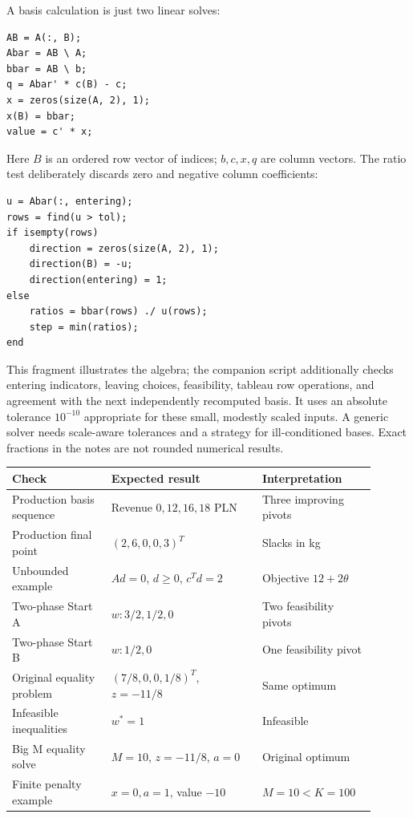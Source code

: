 \documentclass[11pt,a4paper]{article}
\begin{document}
A basis calculation is just two linear solves:
\begin{lstlisting}
AB = A(:, B);
Abar = AB \ A;
bbar = AB \ b;
q = Abar' * c(B) - c;
x = zeros(size(A, 2), 1);
x(B) = bbar;
value = c' * x;
\end{lstlisting}
Here $B$ is an ordered row vector of indices; $b,c,x,q$ are column vectors.
The ratio test deliberately discards zero and negative column coefficients:
\begin{lstlisting}
u = Abar(:, entering);
rows = find(u > tol);
if isempty(rows)
    direction = zeros(size(A, 2), 1);
    direction(B) = -u;
    direction(entering) = 1;
else
    ratios = bbar(rows) ./ u(rows);
    step = min(ratios);
end
\end{lstlisting}
This fragment illustrates the algebra; the companion script additionally checks
entering indicators, leaving choices, feasibility, tableau row operations, and
agreement with the next independently recomputed basis. It uses an absolute
tolerance $10^{-10}$ appropriate for these small, modestly scaled inputs.
A generic solver needs scale-aware tolerances and a strategy for ill-conditioned
bases. Exact fractions in the notes are not rounded numerical results.

\begin{center}
  \begin{tabular}{>{\raggedright\arraybackslash}p{0.25\linewidth}>{\raggedright\arraybackslash}p{0.38\linewidth}>{\raggedright\arraybackslash}p{0.27\linewidth}}\toprule
    Check & Expected result & Interpretation\\\midrule
    Production basis sequence & Revenue $0,12,16,18$ PLN & Three improving pivots\\
    Production final point & $(2,6,0,0,3)^T$ & Slacks in kg\\
    Unbounded example & $Ad=0$, $d\geq0$, $c^Td=2$ & Objective $12+2\theta$\\
    Two-phase Start A & $w:3/2,1/2,0$ & Two feasibility pivots\\
    Two-phase Start B & $w:1/2,0$ & One feasibility pivot\\
    Original equality problem & $(7/8,0,0,1/8)^T$, $z=-11/8$ & Same optimum\\
    Infeasible inequalities & $w^*=1$ & Infeasible\\
    Big M equality solve & $M=10$, $z=-11/8$, $a=0$ & Original optimum\\
    Finite penalty example & $x=0,a=1$, value $-10$ & $M=10<K=100$\\\bottomrule
  \end{tabular}
\end{center}
\end{document}
